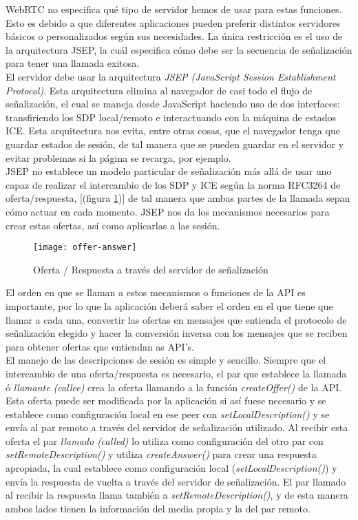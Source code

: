 WebRTC no especifica qué tipo de servidor hemos de usar para estas funciones. Esto es debido a que diferentes aplicaciones pueden preferir distintos servidores básicos o personalizados según sus necesidades. La única restricción es el uso de la arquitectura JSEP, la cuál especifica cómo debe ser la secuencia de señalización para tener una llamada exitosa.\\


El servidor debe usar la arquitectura \emph{JSEP (JavaScript Session Establishment Protocol)}. Esta arquitectura elimina al navegador de casi todo el flujo de señalización, el cual se maneja desde JavaScript haciendo uso de dos interfaces: transfiriendo los SDP local/remoto e interactuando con la máquina de estados ICE. Esta arquitectura nos evita, entre otras cosas, que el navegador tenga que guardar estados de sesión, de tal manera que se pueden guardar en el servidor y evitar problemas si la página se recarga, por ejemplo. \\

JSEP no establece un modelo particular de señalización más allá de usar uno capaz de realizar el intercambio de los SDP y ICE según la norma RFC3264 de oferta/respuesta, [(figura \ref{fig:oferta-respuesta})] de tal manera que ambas partes de la llamada sepan cómo actuar en cada momento. JSEP nos da los mecanismos necesarios para crear estas ofertas, así como aplicarlas a las sesión.\\

\begin{figure}[htb]
\centering
\texttt{[image: offer-answer]}
\caption{Oferta / Respuesta a través del servidor de señalización}
\label{fig:oferta-respuesta}
\end{figure}


El orden en que se llaman a estos mecanismos o funciones de la API es importante, por lo que la aplicación deberá saber el orden en el que tiene que llamar a cada una, convertir las ofertas en mensajes que entienda el protocolo de señalización elegido y hacer la conversión inversa con los mensajes que se reciben para obtener ofertas que entiendan as API's.\\

El manejo de las descripciones de sesión es simple y sencillo. Siempre que el intercambio de una oferta/respuesta es necesario, el par que establece la llamada ó \textit{llamante (callee)} crea la oferta llamando a la función \emph{createOffer()} de la API. Esta oferta puede ser modificada por la aplicación si así fuese necesario y se establece como configuración local en ese peer con \emph{setLocalDescription()} y se envía al par remoto a través del servidor de señalización utilizado. Al recibir esta oferta el par \textit{llamado (called)} lo utiliza como configuración del otro par con \emph{setRemoteDescription()} y utiliza \emph{createAnswer()} para crear una respuesta apropiada, la cual establece como configuración local (\emph{setLocalDescription()}) y envía la respuesta de vuelta a través del servidor de señalización. El par llamado al recibir la respuesta llama también a \emph{setRemoteDescription()}, y de esta manera ambos lados tienen la información del media propia y la del par remoto.\\ 


